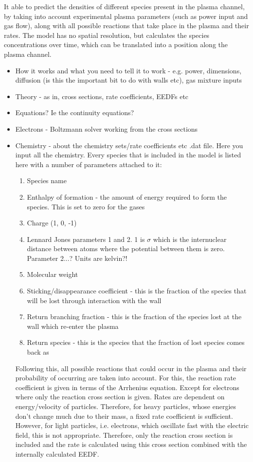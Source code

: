 \documentclass[11pt, oneside]{article}   	%
\begin{document}
It able to predict the densities of different species present in the plasma channel, by taking into account experimental plasma parameters (such as power input and gas flow), along with all possible reactions that take place in the plasma and their rates.
The model has no spatial resolution, but calculates the species concentrations over time, which can be translated into a position along the plasma channel.


\begin{itemize}
\item How it works and what you need to tell it to work - e.g. power, dimensions, diffusion (is this the important bit to do with walls etc), gas mixture inputs
\item Theory - as in, cross sections, rate coefficients, EEDFs etc
\item Equations? Ie the continuity equations?
\item Electrons - Boltzmann solver working from the cross sections
\item Chemistry - about the chemistry sets/rate coefficients etc
.dat file. Here you input all the chemistry. Every species that is included in the model is listed here with a number of parameters attached to it:
\begin{enumerate}
\item Species name
\item Enthalpy of formation - the amount of energy required to form the species. This is set to zero for the gases
\item Charge (1, 0, -1)
\item Lennard Jones parameters 1 and 2. 1 is $\sigma$ which is the internuclear distance between atoms where the potential between them is zero. Parameter 2...? Units are kelvin?!
\item Molecular weight
\item Sticking/disappearance coefficient - this is the fraction of the species that will be lost through interaction with the wall
\item Return branching fraction - this is the fraction of the species lost at the wall which re-enter the plasma
\item Return species - this is the species that the fraction of lost species comes back as
\end{enumerate}
Following this, all possible reactions that could occur in the plasma and their probability of occurring are taken into account. 
For this, the reaction rate coefficient is given in terms of the Arrhenius equation. 
Except for electrons where only the reaction cross section is given. 
Rates are dependent on energy/velocity of particles. 
Therefore, for heavy particles, whose energies don't change much due to their mass, a fixed rate coefficient is sufficient. 
However, for light particles, i.e. electrons, which oscillate fast with the electric field, this is not appropriate.
Therefore, only the reaction cross section is included and the rate is calculated using this cross section combined with the internally calculated EEDF.


\end{itemize}
\end{document}
